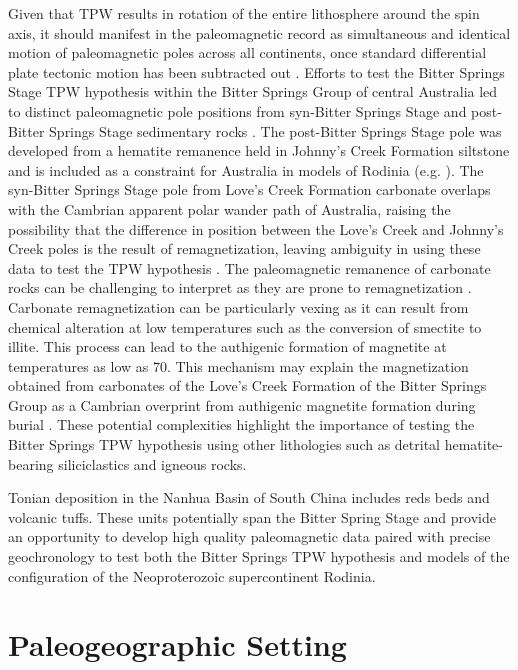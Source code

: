 Given that TPW results in rotation of the entire lithosphere around the spin axis, it should manifest in the paleomagnetic record as simultaneous and identical motion of paleomagnetic poles across all continents, once standard differential plate tectonic motion has been subtracted out \citep{Evans2003a}. Efforts to test the Bitter Springs Stage TPW hypothesis within the Bitter Springs Group of central Australia led to distinct paleomagnetic pole positions from syn-Bitter Springs Stage and post-Bitter Springs Stage sedimentary rocks \citep{Swanson-Hysell2012a}. The post-Bitter Springs Stage pole was developed from a hematite remanence held in Johnny's Creek Formation siltstone and is included as a constraint for Australia in models of Rodinia (e.g. \citealp{Merdith2017a}). The syn-Bitter Springs Stage pole from Love's Creek Formation carbonate overlaps with the Cambrian apparent polar wander path of Australia, raising the possibility that the difference in position between the Love's Creek and Johnny's Creek poles is the result of remagnetization, leaving ambiguity in using these data to test the TPW hypothesis \citep{Swanson-Hysell2012a}. The paleomagnetic remanence of carbonate rocks can be challenging to interpret as they are prone to remagnetization \citep{Van-Der-Voo2012a, Jackson2012a}. Carbonate remagnetization can be particularly vexing as it can result from chemical alteration at low temperatures such as the conversion of smectite to illite. This process can lead to the authigenic formation of magnetite at temperatures as low as 70\degreesC \citep{Katz1998a, Tohver2008a}. This mechanism may explain the magnetization obtained from carbonates of the Love's Creek Formation of the Bitter Springs Group as a Cambrian overprint from authigenic magnetite formation during burial \citep{Swanson-Hysell2012a}. These potential complexities highlight the importance of testing the Bitter Springs TPW hypothesis using other lithologies such as detrital hematite-bearing siliciclastics and igneous rocks.

Tonian deposition in the Nanhua Basin of South China includes reds beds and volcanic tuffs. These units potentially span the Bitter Spring Stage and provide an opportunity to develop high quality paleomagnetic data paired with precise geochronology to test both the Bitter Springs TPW hypothesis and models of the configuration of the Neoproterozoic supercontinent Rodinia.

\section{Paleogeographic Setting}

